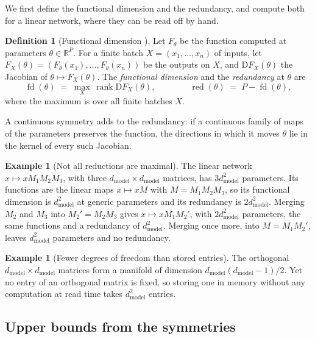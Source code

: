 \documentclass[10pt]{article}
\theoremstyle{definition}
\newtheorem{definition}[theorem]{Definition}
\newtheorem{example}[theorem]{Example}
\theoremstyle{remark}
\newcommand{\R}{\mathbb{R}}
\newcommand{\dm}{d_{\mathrm{model}}}
\newcommand{\Der}{\mathrm{D}}
\begin{document}
We first define the functional dimension and the redundancy, and compute both for a linear network, where they can be read off by hand.

\begin{definition}[Functional dimension {\citep{grigsby2022functional}}]\label{def:fd}
Let $F_\theta$ be the function computed at parameters $\theta \in \R^P$. For a finite batch $X = (x_1, \dots, x_n)$ of inputs, let $F_X(\theta) = (F_\theta(x_1), \dots, F_\theta(x_n))$ be the outputs on $X$, and $\Der F_X(\theta)$ the Jacobian of $\theta \mapsto F_X(\theta)$. The \emph{functional dimension} and the \emph{redundancy} at $\theta$ are
\[
\operatorname{fd}(\theta) \;=\; \max_{X}\, \operatorname{rank} \Der F_X(\theta), \qquad\qquad \operatorname{red}(\theta) \;=\; P - \operatorname{fd}(\theta),
\]
where the maximum is over all finite batches $X$.
\end{definition}

A continuous symmetry adds to the redundancy: if a continuous family of maps of the parameters preserves the function, the directions in which it moves $\theta$ lie in the kernel of every such Jacobian.

\begin{example}[Not all reductions are maximal]\label{ex:three}
The linear network $x \mapsto xM_1M_2M_3$, with three $\dm\times\dm$ matrices, has $3\dm^2$ parameters. Its functions are the linear maps $x \mapsto xM$ with $M = M_1M_2M_3$, so its functional dimension is $\dm^2$ at generic parameters and its redundancy is $2\dm^2$. Merging $M_2$ and $M_3$ into $M_2' = M_2M_3$ gives $x \mapsto xM_1M_2'$, with $2\dm^2$ parameters, the same functions and a redundancy of $\dm^2$. Merging once more, into $M = M_1M_2'$, leaves $\dm^2$ parameters and no redundancy.
\end{example}

\begin{example}[Fewer degrees of freedom than stored entries]\label{ex:orth}
The orthogonal $\dm\times\dm$ matrices form a manifold of dimension $\dm(\dm-1)/2$. Yet no entry of an orthogonal matrix is fixed, so storing one in memory without any computation at read time takes $\dm^2$ entries.
\end{example}

\subsection{Upper bounds from the symmetries}\label{sec:count}
\end{document}
